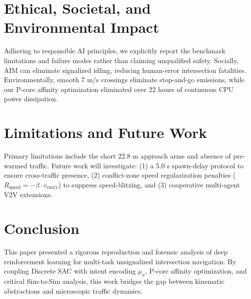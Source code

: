 \documentclass[journal]{IEEEtran}
\begin{document}
\section{Ethical, Societal, and Environmental Impact}
Adhering to responsible AI principles, we explicitly report the benchmark limitations and failure modes rather than claiming unqualified safety. Socially, AIM can eliminate signalized idling, reducing human-error intersection fatalities. Environmentally, smooth 7 m/s crossings eliminate stop-and-go emissions, while our P-core affinity optimization eliminated over 22 hours of continuous CPU power dissipation.

\section{Limitations and Future Work}
Primary limitations include the short 22.8 m approach arms and absence of pre-warmed traffic. Future work will investigate: (1) a 5.0 s spawn-delay protocol to ensure cross-traffic presence, (2) conflict-zone speed regularization penalties ($R_{\text{speed}} = -\beta \cdot v_{\text{entry}}$) to suppress speed-blitzing, and (3) cooperative multi-agent V2V extensions.

\section{Conclusion}
This paper presented a rigorous reproduction and forensic analysis of deep reinforcement learning for multi-task unsignalized intersection navigation. By coupling Discrete SAC with intent encoding $\mu_a$, P-core affinity optimization, and critical Sim-to-Sim analysis, this work bridges the gap between kinematic abstractions and microscopic traffic dynamics.



\end{document}
